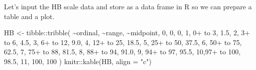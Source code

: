 \documentclass[
  letterpaper,
]{book}
\newenvironment{Shaded}{\begin{snugshade}}{\end{snugshade}}
\newcommand{\AttributeTok}[1]{\textcolor[rgb]{0.40,0.45,0.13}{#1}}
\newcommand{\DecValTok}[1]{\textcolor[rgb]{0.68,0.00,0.00}{#1}}
\newcommand{\FloatTok}[1]{\textcolor[rgb]{0.68,0.00,0.00}{#1}}
\newcommand{\FunctionTok}[1]{\textcolor[rgb]{0.28,0.35,0.67}{#1}}
\newcommand{\NormalTok}[1]{\textcolor[rgb]{0.00,0.23,0.31}{#1}}
\newcommand{\OtherTok}[1]{\textcolor[rgb]{0.00,0.23,0.31}{#1}}
\newcommand{\SpecialCharTok}[1]{\textcolor[rgb]{0.37,0.37,0.37}{#1}}
\newcommand{\StringTok}[1]{\textcolor[rgb]{0.13,0.47,0.30}{#1}}
\begin{document}
Let's input the HB scale data and store as a data frame in R so we can
prepare a table and a plot.

\begin{Shaded}
\begin{Highlighting}[]
\NormalTok{HB }\OtherTok{\textless{}{-}}\NormalTok{ tibble}\SpecialCharTok{::}\FunctionTok{tribble}\NormalTok{(}
  \SpecialCharTok{\textasciitilde{}}\NormalTok{ordinal, }\SpecialCharTok{\textasciitilde{}}\StringTok{\textquotesingle{}range\textquotesingle{}}\NormalTok{, }\SpecialCharTok{\textasciitilde{}}\NormalTok{midpoint,}
  \DecValTok{0}\NormalTok{,          }\StringTok{\textquotesingle{}0\textquotesingle{}}\NormalTok{,    }\DecValTok{0}\NormalTok{,   }
  \DecValTok{1}\NormalTok{,    }\StringTok{\textquotesingle{}0+ to 3\textquotesingle{}}\NormalTok{,  }\FloatTok{1.5}\NormalTok{,   }
  \DecValTok{2}\NormalTok{,    }\StringTok{\textquotesingle{}3+ to 6\textquotesingle{}}\NormalTok{,  }\FloatTok{4.5}\NormalTok{,   }
  \DecValTok{3}\NormalTok{,   }\StringTok{\textquotesingle{}6+ to 12\textquotesingle{}}\NormalTok{,  }\FloatTok{9.0}\NormalTok{,  }
  \DecValTok{4}\NormalTok{,  }\StringTok{\textquotesingle{}12+ to 25\textquotesingle{}}\NormalTok{, }\FloatTok{18.5}\NormalTok{, }
  \DecValTok{5}\NormalTok{,  }\StringTok{\textquotesingle{}25+ to 50\textquotesingle{}}\NormalTok{, }\FloatTok{37.5}\NormalTok{, }
  \DecValTok{6}\NormalTok{,  }\StringTok{\textquotesingle{}50+ to 75\textquotesingle{}}\NormalTok{, }\FloatTok{62.5}\NormalTok{, }
  \DecValTok{7}\NormalTok{,  }\StringTok{\textquotesingle{}75+ to 88\textquotesingle{}}\NormalTok{, }\FloatTok{81.5}\NormalTok{, }
  \DecValTok{8}\NormalTok{,  }\StringTok{\textquotesingle{}88+ to 94\textquotesingle{}}\NormalTok{, }\FloatTok{91.0}\NormalTok{, }
  \DecValTok{9}\NormalTok{,  }\StringTok{\textquotesingle{}94+ to 97\textquotesingle{}}\NormalTok{, }\FloatTok{95.5}\NormalTok{, }
  \DecValTok{10}\NormalTok{,}\StringTok{\textquotesingle{}97+ to 100\textquotesingle{}}\NormalTok{, }\FloatTok{98.5}\NormalTok{,  }
  \DecValTok{11}\NormalTok{,      }\StringTok{\textquotesingle{}100\textquotesingle{}}\NormalTok{,   }\DecValTok{100} 
\NormalTok{  )}
\NormalTok{knitr}\SpecialCharTok{::}\FunctionTok{kable}\NormalTok{(HB, }\AttributeTok{align =} \StringTok{"c"}\NormalTok{)}
\end{Highlighting}
\end{Shaded}
\end{document}
